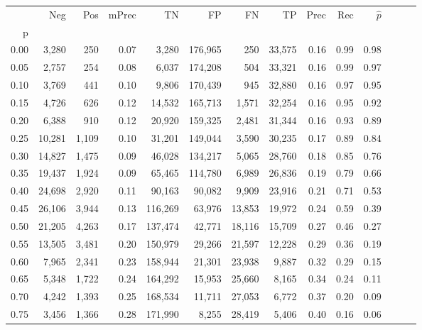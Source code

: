 \begin{tabular}{rrrrrrrrrrrrrr}
\toprule
{} &     Neg &    Pos & mPrec &       TN &       FP &      FN &      TP &  Prec &   Rec & $\hat{p}$ \\
p    &         &        &       &          &          &         &         &       &       &           \\
\midrule
0.00 &   3,280 &    250 &  0.07 &    3,280 &  176,965 &     250 &  33,575 &  0.16 &  0.99 &      0.98 \\
0.05 &   2,757 &    254 &  0.08 &    6,037 &  174,208 &     504 &  33,321 &  0.16 &  0.99 &      0.97 \\
0.10 &   3,769 &    441 &  0.10 &    9,806 &  170,439 &     945 &  32,880 &  0.16 &  0.97 &      0.95 \\
0.15 &   4,726 &    626 &  0.12 &   14,532 &  165,713 &   1,571 &  32,254 &  0.16 &  0.95 &      0.92 \\
0.20 &   6,388 &    910 &  0.12 &   20,920 &  159,325 &   2,481 &  31,344 &  0.16 &  0.93 &      0.89 \\
0.25 &  10,281 &  1,109 &  0.10 &   31,201 &  149,044 &   3,590 &  30,235 &  0.17 &  0.89 &      0.84 \\
0.30 &  14,827 &  1,475 &  0.09 &   46,028 &  134,217 &   5,065 &  28,760 &  0.18 &  0.85 &      0.76 \\
0.35 &  19,437 &  1,924 &  0.09 &   65,465 &  114,780 &   6,989 &  26,836 &  0.19 &  0.79 &      0.66 \\
0.40 &  24,698 &  2,920 &  0.11 &   90,163 &   90,082 &   9,909 &  23,916 &  0.21 &  0.71 &      0.53 \\
0.45 &  26,106 &  3,944 &  0.13 &  116,269 &   63,976 &  13,853 &  19,972 &  0.24 &  0.59 &      0.39 \\
0.50 &  21,205 &  4,263 &  0.17 &  137,474 &   42,771 &  18,116 &  15,709 &  0.27 &  0.46 &      0.27 \\
0.55 &  13,505 &  3,481 &  0.20 &  150,979 &   29,266 &  21,597 &  12,228 &  0.29 &  0.36 &      0.19 \\
0.60 &   7,965 &  2,341 &  0.23 &  158,944 &   21,301 &  23,938 &   9,887 &  0.32 &  0.29 &      0.15 \\
0.65 &   5,348 &  1,722 &  0.24 &  164,292 &   15,953 &  25,660 &   8,165 &  0.34 &  0.24 &      0.11 \\
0.70 &   4,242 &  1,393 &  0.25 &  168,534 &   11,711 &  27,053 &   6,772 &  0.37 &  0.20 &      0.09 \\
0.75 &   3,456 &  1,366 &  0.28 &  171,990 &    8,255 &  28,419 &   5,406 &  0.40 &  0.16 &      0.06 \\

\end{tabular}
